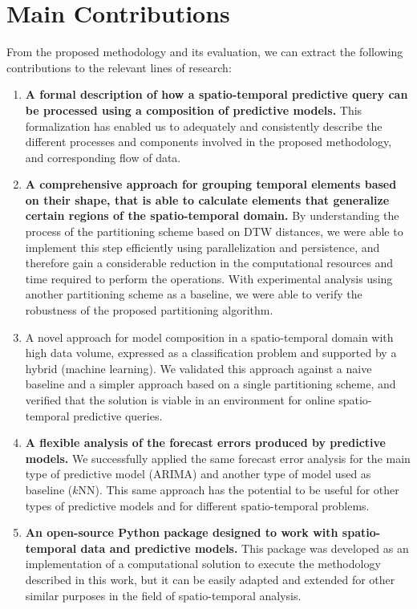 \section{Main Contributions}
\label{Sec:MainContributions}

From the proposed methodology and its evaluation, we can extract the following contributions to the relevant lines of research:

\begin{enumerate}
\item \textbf{A formal description of how a spatio-temporal predictive query can be processed using a composition of predictive models.} This formalization has enabled us to adequately and consistently describe the different processes and components involved in the proposed methodology, and corresponding flow of data.

\item \textbf{A comprehensive approach for grouping temporal elements based on their shape, that is able to calculate elements that generalize certain regions of the spatio-temporal domain.} By understanding the process of the partitioning scheme based on DTW distances, we were able to implement this step efficiently using parallelization and persistence, and therefore gain a considerable reduction in the computational resources and time required to perform the operations. With experimental analysis using another partitioning scheme as a baseline, we were able to verify the robustness of the proposed partitioning algorithm.

\item A novel approach for model composition in a spatio-temporal domain with high data volume, expressed as a classification problem and supported by a hybrid (machine learning). We validated this approach against a naive baseline and a simpler approach based on a single partitioning scheme, and verified that the solution is viable in an environment for online spatio-temporal predictive queries.

\item \textbf{A flexible analysis of the forecast errors produced by predictive models.} We successfully applied the same forecast error analysis for the main type of predictive model (ARIMA) and another type of model used as baseline ($k$NN). This same approach has the potential to be useful for other types of predictive models and for different spatio-temporal problems.

\item \textbf{An open-source Python package designed to work with spatio-temporal data and predictive models.} This package was developed as an implementation of a computational solution to execute the methodology described in this work, but it can be easily adapted and extended for other similar purposes in the field of spatio-temporal analysis.

\end{enumerate}

